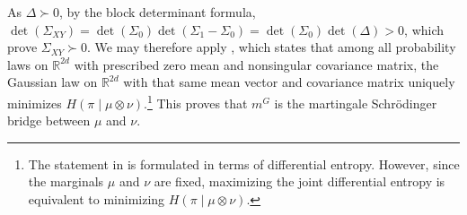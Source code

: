 \documentclass[reqno, a4paper]{amsart}
\DeclareMathOperator{\Var}{Var}
\theoremstyle{plain}
\theoremstyle{definition}
\theoremstyle{remark}
\newtheorem{remark}[theorem]{Remark}
\numberwithin{equation}{section}
\numberwithin{theorem}{section}
\newcommand{\R}{\mathbb{R}}
\newcommand{\MT}{\mathsf{MT}}
\begin{document}
    As $\Delta\succ0$, by the block determinant formula,
	$
	\det(\Sigma_{XY})
	=
	\det(\Sigma_0)\det(\Sigma_1-\Sigma_0)
	=
	\det(\Sigma_0)\det(\Delta)>0$, which prove $\Sigma_{XY} \succ 0$. We may therefore apply \cite[Theorem~8.6.5]{CoTh06}, which states that among all probability laws on $\R^{2d}$ with prescribed zero mean and nonsingular covariance matrix, the Gaussian law on $\R^{2d}$ with that same mean vector and covariance matrix uniquely minimizes $H(\pi\mid\mu\otimes\nu)$.\footnote{The statement in \cite[Theorem~8.6.5]{CoTh06} is formulated in terms of differential entropy. However, since the marginals $\mu$ and $\nu$ are fixed, maximizing the joint differential entropy is equivalent to minimizing $H(\pi\mid\mu\otimes\nu)$.}
	This proves that $m^G$ is the martingale Schrödinger bridge between $\mu$ and $\nu$. 
    
\end{document}
